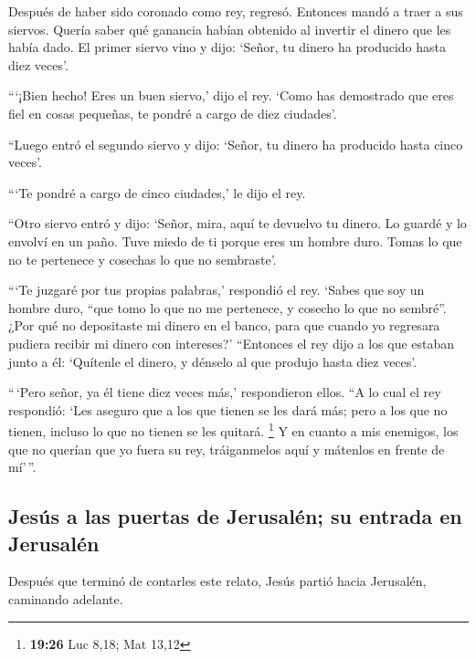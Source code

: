  Después de haber sido coronado como rey, regresó.
Entonces mandó a traer a sus siervos. Quería saber qué ganancia habían
obtenido al invertir el dinero que les había dado.  El
primer siervo vino y dijo: `Señor, tu dinero ha producido hasta diez
veces'.

 ```¡Bien hecho! Eres un buen siervo,' dijo el rey. `Como
has demostrado que eres fiel en cosas pequeñas, te pondré a cargo de
diez ciudades'.

 ``Luego entró el segundo siervo y dijo: `Señor, tu
dinero ha producido hasta cinco veces'.

 ```Te pondré a cargo de cinco ciudades,' le dijo el rey.

 ``Otro siervo entró y dijo: `Señor, mira, aquí te
devuelvo tu dinero. Lo guardé y lo envolví en un paño. 
Tuve miedo de ti porque eres un hombre duro. Tomas lo que no te
pertenece y cosechas lo que no sembraste'.

 ```Te juzgaré por tus propias palabras,' respondió el
rey. `Sabes que soy un hombre duro, ``que tomo lo que no me pertenece, y
cosecho lo que no sembré''.  ¿Por qué no depositaste mi
dinero en el banco, para que cuando yo regresara pudiera recibir mi
dinero con intereses?'  ``Entonces el rey dijo a los que
estaban junto a él: `Quítenle el dinero, y dénselo al que produjo hasta
diez veces'.

 ``\,`Pero señor, ya él tiene diez veces más,'
respondieron ellos.  ``A lo cual el rey respondió: `Les
aseguro que a los que tienen se les dará más; pero a los que no tienen,
incluso lo que no tienen se les quitará. \footnote{\textbf{19:26} Luc
  8,18; Mat 13,12}  Y en cuanto a mis enemigos, los que
no querían que yo fuera su rey, tráiganmelos aquí y mátenlos en frente
de mí'\,''.

\hypertarget{jesuxfas-a-las-puertas-de-jerusaluxe9n-su-entrada-en-jerusaluxe9n}{%
\subsection{Jesús a las puertas de Jerusalén; su entrada en
Jerusalén}\label{jesuxfas-a-las-puertas-de-jerusaluxe9n-su-entrada-en-jerusaluxe9n}}

 Después que terminó de contarles este relato, Jesús
partió hacia Jerusalén, caminando adelante.

